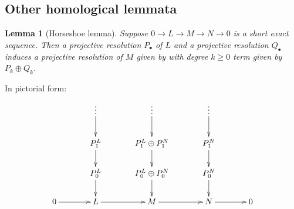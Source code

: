 \documentclass[11pt,a4paper]{article}
\numberwithin{equation}{section}
\theoremstyle{all}
\newtheorem{lemma}[theorem]{Lemma}
\theoremstyle{remark}
\newtheorem{remark}[theorem]{Remark}
\renewcommand{\Im}{\operatorname{Im}\nolimits}
\newcommand{\Ker}{\operatorname{Ker}\nolimits}
\begin{document}
%


\subsection{Other homological lemmata}



\begin{lemma}[Horseshoe lemma]
Suppose $0\to L\to M\to N\to 0$ is a short exact sequence.  Then a projective resolution $P_\bullet$ of $L$ and a projective resolution $Q_\bullet$ induces a projective resolution of $M$ given by with degree $k\geq 0$ term given by $P_k\oplus Q_k$.
\end{lemma}
In pictorial form:
\[
\xymatrix@C=35pt@R=20pt{ 
& \vdots\ar[d] & \vdots\ar[d] & \vdots\ar[d] & \\
& P^L_1 \ar[d] & P^L_1\oplus P^N_1 \ar[d] & P^N_1 \ar[d] & \\
& P^L_0 \ar[d] & P^L_0\oplus P^N_0 \ar[d] & P^N_0 \ar[d] & \\
0 \ar[r] & L \ar[r] & M \ar[r] & N \ar[r] & 0 \\ 
}
\]
\end{document}
